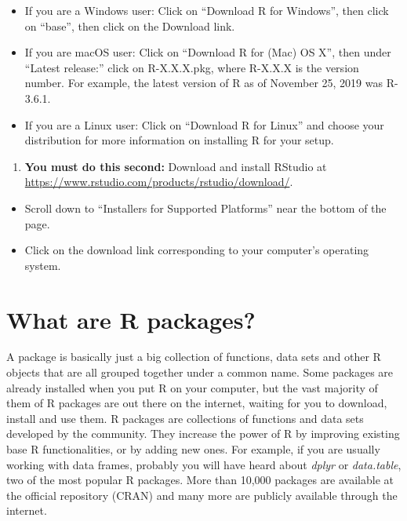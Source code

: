 \documentclass[
  12pt,
  oneside]{book}
\providecommand{\tightlist}{%
  \setlength{\itemsep}{0pt}\setlength{\parskip}{0pt}}
\theoremstyle{definition}
\theoremstyle{definition}
\theoremstyle{definition}
\theoremstyle{definition}
\theoremstyle{remark}
\begin{document}
\begin{itemize}
\tightlist
\item
  If you are a Windows user: Click on ``Download R for Windows'', then click on ``base'', then click on the Download link.
\item
  If you are macOS user: Click on ``Download R for (Mac) OS X'', then under ``Latest release:'' click on R-X.X.X.pkg, where R-X.X.X is the version number. For example, the latest version of R as of November 25, 2019 was R-3.6.1.
\item
  If you are a Linux user: Click on ``Download R for Linux'' and choose your distribution for more information on installing R for your setup.
\end{itemize}

\begin{enumerate}
\def\labelenumi{\arabic{enumi}.}
\tightlist
\item
  \textbf{You must do this second:} Download and install RStudio at \url{https://www.rstudio.com/products/rstudio/download/}.
\end{enumerate}

\begin{itemize}
\tightlist
\item
  Scroll down to ``Installers for Supported Platforms'' near the bottom of the page.
\item
  Click on the download link corresponding to your computer's operating system.
\end{itemize}

\hypertarget{packages}{%
\section{What are R packages?}\label{packages}}

A package is basically just a big collection of functions, data sets and other R objects that are all grouped together under a common name. Some packages are already installed when you put R on your computer, but the vast majority of them of R packages are out there on the internet, waiting for you to download, install and use them.
R packages are collections of functions and data sets developed by the community. They increase the power of R by improving existing base R functionalities, or by adding new ones. For example, if you are usually working with data frames, probably you will have heard about \emph{dplyr} or \emph{data.table}, two of the most popular R packages. More than 10,000 packages are available at the official repository (CRAN) and many more are publicly available through the internet.
\end{document}
